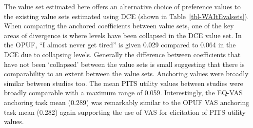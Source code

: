 \documentclass[
  letterpaper,
  DIV=11,
  numbers=noendperiod]{scrartcl}
\begin{document}
The value set estimated here offers an alternative choice of preference
values to the existing value sets estimated using DCE (shown in
Table~\ref{tbl-WAItEvalsets}). When comparing the anchored coefficients
between value sets, one of the key areas of divergence is where levels
have been collapsed in the DCE value set. In the OPUF, ``I almost never
get tired'' is given 0.029 compared to 0.064 in the DCE due to
collapsing levels. Generally the difference between coefficients that
have not been `collapsed' between the value sets is small suggesting
that there is comparability to an extent between the value sets.
Anchoring values were broadly similar between studies too. The mean PITS
utility values between studies were broadly comparable with a maximum
range of 0.059. Interestingly, the EQ-VAS anchoring task mean (0.289)
was remarkably similar to the OPUF VAS anchoring task mean (0.282) again
supporting the use of VAS for elicitation of PITS utility values.
\end{document}
